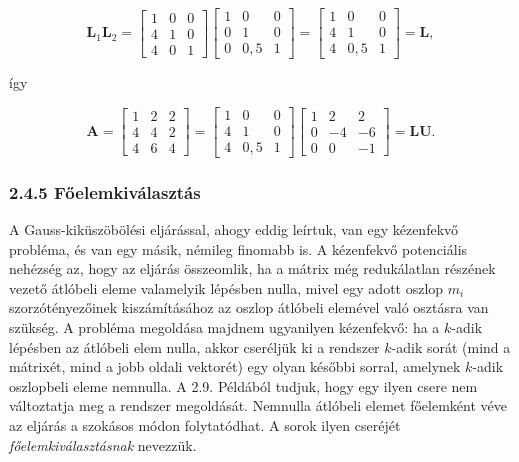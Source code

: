 \documentclass[
  magyar,
  11pt]{article}
\providecommand{\boldsymbol}[1]{\mathbf{#1}}
\begin{document}
\[\boldsymbol{L}_1\boldsymbol{L}_2 = \begin{bmatrix} 1 & 0 & 0 \\ 4 & 1 & 0 \\ 4 & 0 & 1 \end{bmatrix} \begin{bmatrix} 1 & 0 & 0 \\ 0 & 1 & 0 \\ 0 & 0{,}5 & 1 \end{bmatrix} = \begin{bmatrix} 1 & 0 & 0 \\ 4 & 1 & 0 \\ 4 & 0{,}5 & 1 \end{bmatrix} = \boldsymbol{L},\]

így

\[\mathbf{A} = \begin{bmatrix} 1 & 2 & 2 \\ 4 & 4 & 2 \\ 4 & 6 & 4 \end{bmatrix} = \begin{bmatrix} 1 & 0 & 0 \\ 4 & 1 & 0 \\ 4 & 0{,}5 & 1 \end{bmatrix} \begin{bmatrix} 1 & 2 & 2 \\ 0 & -4 & -6 \\ 0 & 0 & -1 \end{bmatrix} = \mathbf{L}\mathbf{U}.\]

\subsubsection{2.4.5
Főelemkiválasztás}\label{fux151elemkivuxe1lasztuxe1s}

A Gauss-kiküszöbölési eljárással, ahogy eddig leírtuk, van egy
kézenfekvő probléma, és van egy másik, némileg finomabb is. A kézenfekvő
potenciális nehézség az, hogy az eljárás összeomlik, ha a mátrix még
redukálatlan részének vezető átlóbeli eleme valamelyik lépésben nulla,
mivel egy adott oszlop \(m_i\) szorzótényezőinek kiszámításához az
oszlop átlóbeli elemével való osztásra van szükség. A probléma megoldása
majdnem ugyanilyen kézenfekvő: ha a \(k\)-adik lépésben az átlóbeli elem
nulla, akkor cseréljük ki a rendszer \(k\)-adik sorát (mind a mátrixét,
mind a jobb oldali vektorét) egy olyan későbbi sorral, amelynek
\(k\)-adik oszlopbeli eleme nemnulla. A 2.9. Példából tudjuk, hogy egy
ilyen csere nem változtatja meg a rendszer megoldását. Nemnulla átlóbeli
elemet főelemként véve az eljárás a szokásos módon folytatódhat. A sorok
ilyen cseréjét \emph{főelemkiválasztásnak} nevezzük.
\end{document}
